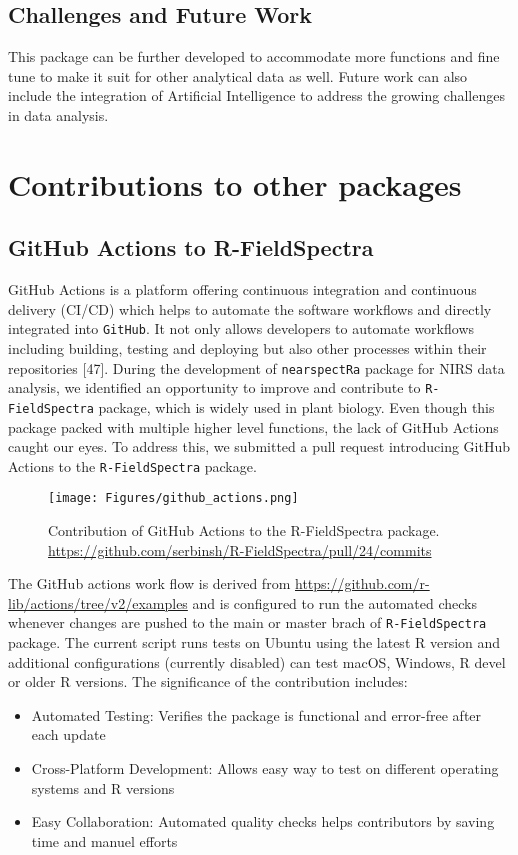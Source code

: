 \documentclass[12pt,a4paper]{report}
\begin{document}
\subsection{Challenges and Future Work}
This package can be further developed to accommodate more functions and fine tune to make it suit for other analytical data as well. Future work can also include the integration of Artificial Intelligence to address the growing challenges in data analysis. 


\section{Contributions to other packages}
\subsection{GitHub Actions to R-FieldSpectra}

GitHub Actions is a platform offering continuous integration and continuous delivery (CI/CD) which helps to automate the software workflows and directly integrated into \texttt{GitHub}. It not only allows developers to automate workflows including building, testing and deploying but also other processes within their repositories [47]. During the development of \texttt{nearspectRa} package for NIRS data analysis, we identified an opportunity to improve and contribute to \texttt{R-FieldSpectra} package, which is widely used in plant biology. Even though this package packed with multiple higher level functions, the lack of GitHub Actions caught our eyes. To address this, we submitted a pull request introducing GitHub Actions to the \texttt{R-FieldSpectra} package. \\

\begin{figure}[h]
    \centering
    \texttt{[image: Figures/github\_actions.png]}
    \caption{Contribution of GitHub Actions to the R-FieldSpectra package. \\ \url{https://github.com/serbinsh/R-FieldSpectra/pull/24/commits}}
    \label{fig:github_actions}
\end{figure}

The GitHub actions work flow is derived from \url{https://github.com/r-lib/actions/tree/v2/examples} and is configured to run the automated checks whenever changes are pushed to the main or master brach of \texttt{R-FieldSpectra} package. The current script runs tests on Ubuntu using the latest R version and additional configurations (currently disabled) can test macOS, Windows, R devel or older R versions. The significance of the contribution includes:
\begin{itemize}
    \item Automated Testing: Verifies the package is functional and error-free after each update
    \item Cross-Platform Development: Allows easy way to test on different operating systems and R versions
    \item Easy Collaboration: Automated quality checks helps contributors  by saving time and manuel efforts
\end{itemize}
\end{document}
